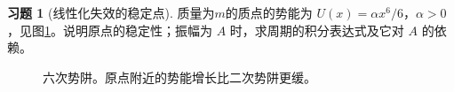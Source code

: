 \documentclass[11pt,openany,fontset=fandol]{ctexbook}
\theoremstyle{definition}\newtheorem{example}{例}[chapter]\newtheorem{exercise}{习题}[chapter]
\begin{document}
\par\medskip\noindent\begin{minipage}{\textwidth}
\begin{exercise}[线性化失效的稳定点]\label{mp4:exercise:l4-h6}
质量为$m$的质点的势能为 $U(x)=\alpha x^6/6$，$\alpha>0$，见图\ref{mp4:fig:l4-h6-q}。说明原点的稳定性；振幅为 $A$ 时，求周期的积分表达式及它对 $A$ 的依赖。
\end{exercise}

\begin{figure}[H]\centering
{}
\caption{六次势阱。原点附近的势能增长比二次势阱更缓。}\label{mp4:fig:l4-h6-q}
\end{figure}
\end{minipage}\par\medskip
\end{document}
